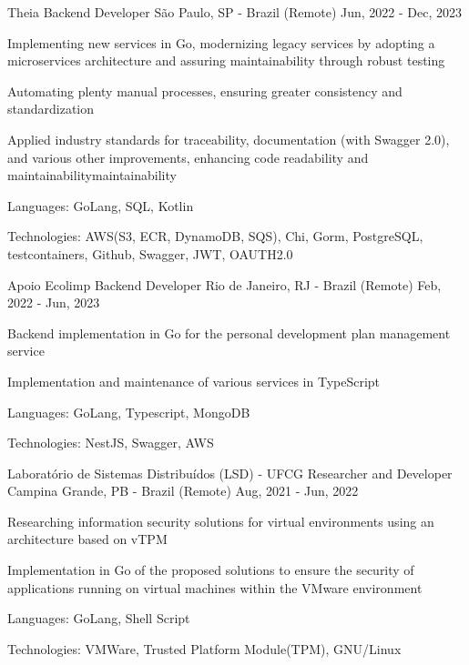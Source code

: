 
\begin{cventries}
  \cventry
  {Theia} %
  {Backend Developer} %
  {São Paulo, SP - Brazil (Remote)} %
  {Jun, 2022 - Dec, 2023} %
  {
    \begin{cvitems} %
      \item {Implementing new services in Go, modernizing legacy services by adopting a microservices architecture and assuring maintainability through robust testing}
      \item {Automating plenty manual processes, ensuring greater consistency and standardization}
      \item {Applied industry standards for traceability, documentation (with Swagger 2.0), and various other improvements, enhancing code readability and maintainabilitymaintainability}
      \item {Languages: GoLang, SQL, Kotlin}
      \item {Technologies: AWS(S3, ECR, DynamoDB, SQS), Chi, Gorm, PostgreSQL, testcontainers, Github, Swagger, JWT, OAUTH2.0}
    \end{cvitems}
  }

  \cventry
  {Apoio Ecolimp} %
  {Backend Developer} %
  {Rio de Janeiro, RJ - Brazil (Remote)} %
  {Feb, 2022 - Jun, 2023} %
  {
    \begin{cvitems} %
      \item {Backend implementation in Go for the personal development plan management service}
      \item {Implementation and maintenance of various services in TypeScript}
      \item {Languages: GoLang, Typescript, MongoDB}
      \item {Technologies: NestJS, Swagger, AWS}
    \end{cvitems}
  }

  \cventry
  {Laboratório de Sistemas Distribuídos (LSD) - UFCG} %
  {Researcher and Developer} %
  {Campina Grande, PB - Brazil (Remote)} %
  {Aug, 2021 - Jun, 2022} %
  {
    \begin{cvitems} %
      \item {Researching information security solutions for virtual environments using an architecture based on vTPM}
      \item {Implementation in Go of the proposed solutions to ensure the security of applications running on virtual machines within the VMware environment}
      \item {Languages: GoLang, Shell Script}
      \item {Technologies: VMWare, Trusted Platform Module(TPM), GNU/Linux}
    \end{cvitems}
  }


\end{cventries}
